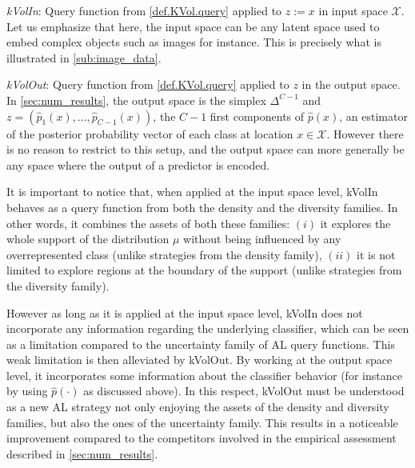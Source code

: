 \documentclass[twoside]{article}
\theoremstyle{definition}
\theoremstyle{remark}
\newcommand{\kvv}{z} %
\newcommand{\paren}[1]{\left( #1 \right)}
\begin{document}
    \emph{kVolIn}: Query function from \cref{def.KVol.query} applied to $\kvv := x$ in input space $\mathcal{X}$. Let us emphasize that here, the input space can be any latent space used to embed complex objects such as images for instance. This is precisely what is illustrated in \cref{sub:image_data}.
    
    \emph{kVolOut}: Query function from \cref{def.KVol.query} applied to $\kvv$ in the output space. In \cref{sec:num_results}, the output space is the simplex $\Delta^{C-1}$ and $\kvv = \paren{\hat p_1(x),\ldots,\hat p_{C-1}(x)}$, the $C-1$ first components of $\hat p(x)$, an estimator of the posterior probability vector of each class at location $x\in\mathcal{X}$. 
    However there is no reason to restrict to this setup, and the output space %
    can more generally be any space where the output of a predictor is encoded. 
    
%
It is important to notice that, when applied at the input space level, kVolIn behaves as a query function from both the density and the diversity families. In other words, it combines the assets of both these families: $(i)$ it explores the whole support of the distribution $\mu$ without being influenced by any overrepresented class (unlike strategies from the density family), $(ii)$ it is not limited to explore regions at the boundary of the support (unlike strategies from the diversity family). 

However as long as it is applied at the input space level, kVolIn does not incorporate any information regarding the underlying classifier, which can be seen as a limitation compared to the uncertainty family of AL query functions.
%
This weak limitation is then alleviated by kVolOut. By working at %
the output space level, it %
incorporates some information about the classifier behavior (for instance by using $\hat p(\cdot)$ as discussed above).
%
In this respect, kVolOut must be understood as a new AL strategy not only enjoying the assets of the density and diversity families, but also the ones of the uncertainty family. This results in a noticeable improvement compared to the competitors involved in the empirical assessment described in \cref{sec:num_results}. 
\end{document}
